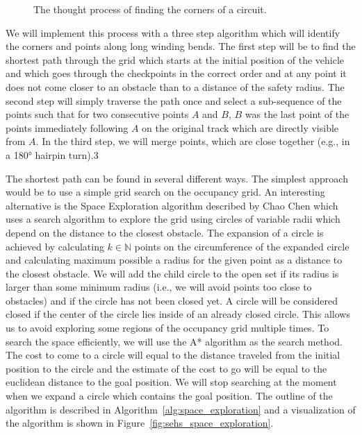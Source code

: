 \begin{figure}
	\label{fig:thought_process}
	\caption{The thought process of finding the corners of a circuit.}
\end{figure}

We will implement this process with a three step algorithm which will identify the corners and points along long winding bends. The first step will be to find the shortest path through the grid which starts at the initial position of the vehicle and which goes through the checkpoints in the correct order and at any point it does not come closer to an obstacle than to a distance of the safety radius. The second step will simply traverse the path once and select a sub-sequence of the points such that for two consecutive points $A$ and $B$, $B$ was the last point of the points immediately following $A$ on the original track which are directly visible from $A$. In the third step, we will merge points, which are close together (e.g., in a 180° hairpin turn).3

The shortest path can be found in several different ways. The simplest approach would be to use a simple grid search on the occupancy grid. An interesting alternative is the Space Exploration algorithm described by Chao Chen \cite{SEHS} which uses a search algorithm to explore the grid using circles of variable radii which depend on the distance to the closest obstacle. The expansion of a circle is achieved by calculating $k\in\mathbb{N}$ points on the circumference of the expanded circle and calculating maximum possible a radius for the given point as a distance to the closest obstacle. We will add the child circle to the open set if its radius is larger than some minimum radius (i.e., we will avoid points too close to obstacles) and if the circle has not been closed yet. A circle will be considered closed if the center of the circle lies inside of an already closed circle. This allows us to avoid exploring some regions of the occupancy grid multiple times. To search the space efficiently, we will use the A* algorithm as the search method. The cost to come to a circle will equal to the distance traveled from the initial position to the circle and the estimate of the cost to go will be equal to the euclidean distance to the goal position. We will stop searching at the moment when we expand a circle which contains the goal position. The outline of the algorithm is described in Algorithm~\ref{alg:space_exploration} and a visualization of the algorithm is shown in Figure~\ref{fig:sehs_space_exploration}.

